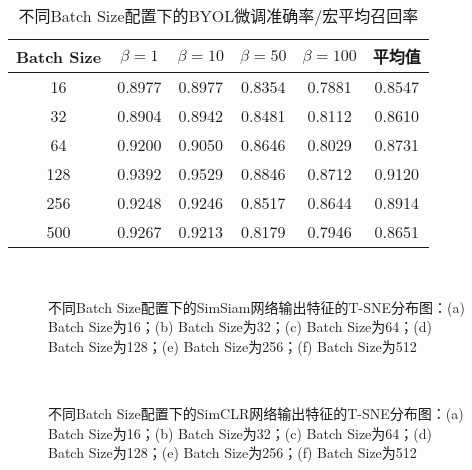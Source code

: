 \documentclass[master]{thesis-uestc}
\begin{document}
\begin{table}[h]
    \centering
    \caption{不同Batch Size配置下的BYOL微调准确率/宏平均召回率}
    \begin{tabular}{cccccc}
    \hline
    \textbf{Batch Size} & \textbf{$\beta = 1$} & \textbf{$\beta = 10$} & \textbf{$\beta = 50$} & \textbf{$\beta = 100$} & \textbf{平均值} \\
    \hline
    16   & 0.8977 & 0.8977 & 0.8354 & 0.7881 & 0.8547 \\
    32   & 0.8904 & 0.8942 & 0.8481 & 0.8112 & 0.8610 \\
    64   & 0.9200 & 0.9050 & 0.8646 & 0.8029 & 0.8731 \\
    128  & 0.9392 & 0.9529 & 0.8846 & 0.8712 & 0.9120 \\
    256  & 0.9248 & 0.9246 & 0.8517 & 0.8644 & 0.8914 \\
    500  & 0.9267 & 0.9213 & 0.8179 & 0.7946 & 0.8651 \\
    \hline
    \end{tabular}
    \label{tab:batch_size_byol_finetune}
\end{table}
\begin{figure}[h]
    \centering
    \\
    
    \caption{不同Batch Size配置下的SimSiam网络输出特征的T-SNE分布图：(a) Batch Size为16；(b) Batch Size为32；(c) Batch Size为64；(d) Batch Size为128；(e) Batch Size为256；(f) Batch Size为512}
    \label{tsne_simsiam_diff_batch_size}
\end{figure}

\begin{figure}[h]
    \centering
    \\
    
    \caption{不同Batch Size配置下的SimCLR网络输出特征的T-SNE分布图：(a) Batch Size为16；(b) Batch Size为32；(c) Batch Size为64；(d) Batch Size为128；(e) Batch Size为256；(f) Batch Size为512}
    \label{tsne_simclr_diff_batch_size}
\end{figure}
\end{document}
